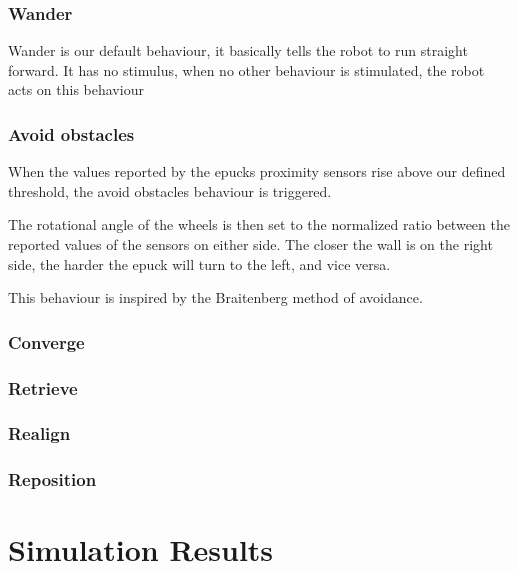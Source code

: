 \documentclass{article}
\begin{document}
\subsubsection{Wander}
Wander is our default behaviour, it basically tells the robot to run straight forward. It has no stimulus, when no other behaviour is stimulated, the robot acts on this behaviour

\subsubsection{Avoid obstacles}
When the values reported by the epucks proximity sensors rise above our defined threshold, the avoid obstacles behaviour is triggered.

The rotational angle of the wheels is then set to the normalized ratio between the reported values of the sensors on either side. The closer the wall is on the right side, the harder the epuck will turn to the left, and vice versa. 

This behaviour is inspired by the Braitenberg method of avoidance.
 
\subsubsection{Converge}


\subsubsection{Retrieve}

\subsubsection{Realign}

\subsubsection{Reposition}

\section{Simulation Results}
\end{document}
